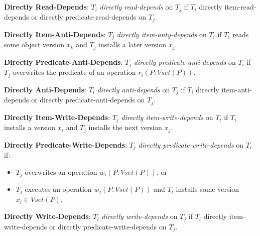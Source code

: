 \begin{definition}
    \textbf{Directly Read-Depends}: $T_i$ \textit{directly read-depends} on $T_j$ if $T_i$ directly item-read-depends or directly predicate-read-depends on $T_j$.
\end{definition}

\begin{definition}
    \textbf{Directly Item-Anti-Depends}: $T_j$ \textit{directly item-anty-depends} on $T_i$ if $T_i$ reads some object version $x_k$ and $T_j$ installs a later version $x_j$.
\end{definition}

\begin{definition}
    \textbf{Directly Predicate-Anti-Depends}: $T_j$ \textit{directly predicate-anti-depends} on $T_i$ if $T_j$ overwrites the predicate of an operation $r_i(P: Vset(P))$. %
\end{definition}

\begin{definition}
    \textbf{Directly Anti-Depends}: $T_i$ \textit{directly anti-depends} on $T_j$ if $T_i$ directly item-anti-depends or directly predicate-anti-depends on $T_j$.
\end{definition}

\begin{definition}
    \textbf{Directly Item-Write-Depends}: $T_j$ \textit{directly item-write-depends} on $T_i$ if $T_i$ installs a version $x_i$ and $T_j$ installs the next version $x_j$.
\end{definition}

\begin{definition}
    \textbf{Directly Predicate-Write-Depends}: $T_j$ \textit{directly predicate-write-depends} on $T_i$ if:
    \begin{itemize}
        \item $T_j$ overwrites an operation $w_i(P: Vset(P))$, or
        \item $T_j$ executes an operation $w_j(P: Vset(P))$ and $T_i$ installs some version $x_i \in Vset(P)$.
    \end{itemize}
\end{definition}

\begin{definition}
    \textbf{Directly Write-Depends}: $T_i$ \textit{directly write-depends} on $T_j$ if $T_i$ directly item-write-depends or directly predicate-write-depends on $T_j$.
\end{definition}

